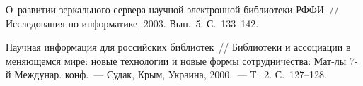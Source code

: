 \begin{multicols}{2}
{{\begin{thebibliography}{9}
\label{end\stat}

 О~развитии 
зеркального сервера научной электронной биб\-лио\-те\-ки РФФИ~// 
Исследования по информатике, 2003. Вып.~5. С.~133--142.

 Научная информация для российских 
биб\-лио\-тек~// Библиотеки и ассоциации в меняющемся мире: новые 
технологии и новые формы сотрудничества: Мат-лы 7-й Междунар. 
конф.~--- Судак, Крым, Украина, 2000.~--- Т.~2. С.~127--128.


\end{thebibliography} } }

\end{multicols}